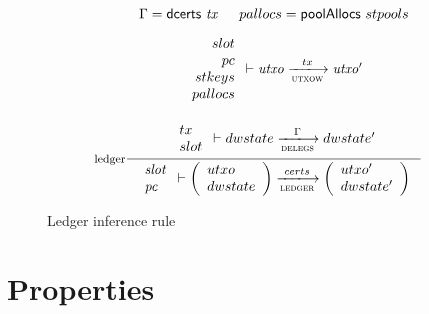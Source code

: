 \documentclass[11pt,a4paper]{article}
\newcommand{\dcerts}[1]{\fun{dcerts}~ \var{#1}}
\theoremstyle{definition}
\theoremstyle{definition}
\begin{document}
\begin{figure}
  \begin{equation}
    \label{eq:ledger}
    \inference[ledger]
    {
      \Gamma = \dcerts{tx}
      & pallocs = \fun{poolAllocs}~stpools\\~\\
      {
        \begin{array}{r}
        slot\\
        pc\\
        stkeys\\
        pallocs\\
        \end{array}
      }
      \vdash \var{utxo} \trans{utxow}{tx} \var{utxo'}\\~\\~\\
      {
        \begin{array}{l}
          tx \\
          slot \\
        \end{array}
      }
      \vdash
      dwstate \trans{delegs}{\Gamma} dwstate'
    }
    {
      \begin{array}{l}
        \var{slot}\\
        \var{pc}\\
      \end{array}
      \vdash
      \left(
        \begin{array}{ll}
          utxo \\
          dwstate \\
        \end{array}
      \right)
      \trans{ledger}{certs}
      \left(
        \begin{array}{ll}
          utxo' \\
          dwstate' \\
        \end{array}
      \right)
    }
  \end{equation}
  \caption{Ledger inference rule}
  \label{fig:rules:ledger}
\end{figure}

\section{Properties}
\label{sec:properties}




\end{document}
